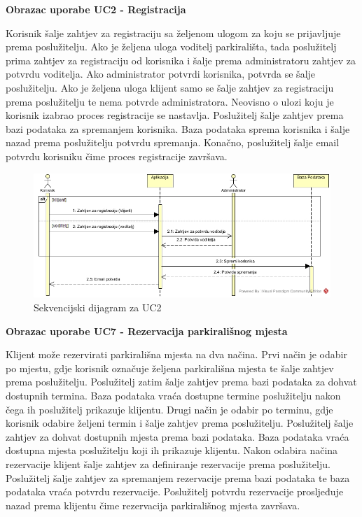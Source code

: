 \vspace{4cm}

\textbf {Obrazac uporabe UC2 - Registracija}

\vspace{1cm}

Korisnik šalje zahtjev za registraciju sa željenom ulogom za koju se prijavljuje prema poslužitelju. Ako je željena uloga voditelj parkirališta, tada poslužitelj prima zahtjev za registraciju od korisnika i šalje prema administratoru zahtjev za potvrdu voditelja. Ako administrator potvrdi korisnika, potvrda se šalje poslužitelju. Ako je željena uloga klijent samo se šalje zahtjev za registraciju prema poslužitelju te nema potvrde administratora.
Neovisno o ulozi koju je korisnik izabrao proces registracije se nastavlja. Poslužitelj šalje zahtjev prema bazi podataka za spremanjem korisnika. Baza podataka sprema korisnika i šalje nazad prema poslužitelju potvrdu spremanja. Konačno, poslužitelj šalje email potvrdu korisniku čime proces registracije završava.

\vspace{1cm}


\begin{figure}[H]
\centering
\includegraphics[width=\textwidth]{slike/SD_UC2.JPG} 
\caption{Sekvencijski dijagram za UC2}
\label{fig:promjene9} 
\end{figure}

\vspace{4cm}

\textbf {Obrazac uporabe UC7 - Rezervacija parkirališnog mjesta}

\vspace{1cm}

Klijent može rezervirati parkirališna mjesta na dva načina. Prvi način je odabir po mjestu, gdje korisnik označuje željena parkirališna mjesta te šalje zahtjev prema poslužitelju. Poslužitelj zatim šalje zahtjev prema bazi podataka za dohvat dostupnih termina. Baza podataka vraća dostupne termine poslužitelju nakon čega ih poslužitelj prikazuje klijentu. Drugi način je odabir po terminu, gdje korisnik odabire željeni termin i šalje zahtjev prema poslužitelju. Poslužitelj šalje zahtjev za dohvat dostupnih mjesta prema bazi podataka. Baza podataka vraća dostupna mjesta poslužitelju koji ih prikazuje klijentu. Nakon odabira načina rezervacije klijent šalje zahtjev za definiranje rezervacije prema poslužitelju. Poslužitelj šalje zahtjev za spremanjem rezervacije prema bazi podataka te baza podataka vraća potvrdu rezervacije. Poslužitelj potvrdu rezervacije prosljeđuje nazad prema klijentu čime rezervacija parkirališnog mjesta završava.

